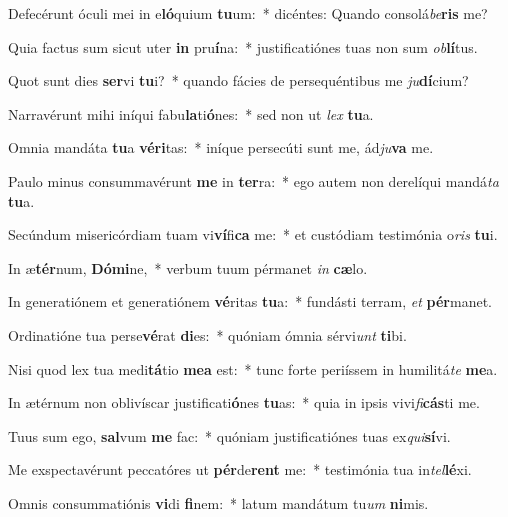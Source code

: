 \item Defecérunt óculi mei in e\textbf{ló}quium \textbf{tu}um:~* dicéntes: Quando consolá\textit{be}\textbf{ris} me?
\item Quia factus sum sicut uter \textbf{in} pru\textbf{í}na:~* justificatiónes tuas non sum \textit{ob}\textbf{lí}tus.
\item Quot sunt dies \textbf{ser}vi \textbf{tu}i?~* quando fácies de persequéntibus me \textit{ju}\textbf{dí}cium?
\item Narravérunt mihi iníqui fabu\textbf{la}ti\textbf{ó}nes:~* sed non ut \textit{lex} \textbf{tu}a.
\item Omnia mandáta \textbf{tu}a \textbf{vé}\textbf{ri}tas:~* iníque persecúti sunt me, ád\textit{ju}\textbf{va} me.
\item Paulo minus consummavérunt \textbf{me} in \textbf{ter}ra:~* ego autem non derelíqui mandá\textit{ta} \textbf{tu}a.
\item Secúndum misericórdiam tuam vi\textbf{ví}fi\textbf{ca} me:~* et custódiam testimónia o\textit{ris} \textbf{tu}i.
\item In æ\textbf{tér}num, \textbf{Dó}\textbf{mi}ne,~* verbum tuum pérmanet \textit{in} \textbf{cæ}lo.
\item In generatiónem et generatiónem \textbf{vé}ritas \textbf{tu}a:~* fundásti terram, \textit{et} \textbf{pér}manet.
\item Ordinatióne tua perse\textbf{vé}rat \textbf{di}es:~* quóniam ómnia sérvi\textit{unt} \textbf{ti}bi.
\item Nisi quod lex tua medi\textbf{tá}tio \textbf{me}\textbf{a} est:~* tunc forte periíssem in humilitá\textit{te} \textbf{me}a.
\item In ætérnum non oblivíscar justificati\textbf{ó}nes \textbf{tu}as:~* quia in ipsis vivi\textit{fi}\textbf{cás}ti me.
\item Tuus sum ego, \textbf{sal}vum \textbf{me} fac:~* quóniam justificatiónes tuas ex\textit{qui}\textbf{sí}vi.
\item Me exspectavérunt peccatóres ut \textbf{pér}de\textbf{rent} me:~* testimónia tua in\textit{tel}\textbf{lé}xi.
\item Omnis consummatiónis \textbf{vi}di \textbf{fi}nem:~* latum mandátum tu\textit{um} \textbf{ni}mis.
